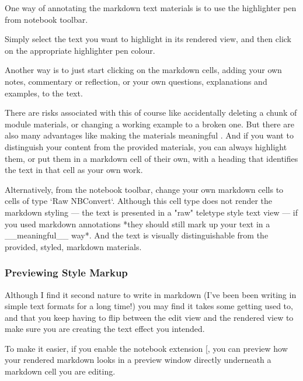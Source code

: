 \documentclass[letterpaper,10pt,english]{sphinxmanual}
\let\sphinxpxdimen\pdfpxdimen\else\newdimen\sphinxpxdimen
\begin{document}
One way of annotating the markdown text materials is to use the highlighter pen from notebook toolbar.

\sphinxincludegraphics[width=1399\sphinxpxdimen,height=251\sphinxpxdimen]{{00_01_highlighter}.png}

Simply select the text you want to highlight in its rendered view, and then click on the appropriate highlighter pen colour.

Another way is to just start clicking on the markdown cells, adding your own notes, commentary or reflection, or your own questions, explanations and examples, to the text.

There are risks associated with this of course \sphinxhyphen{} like accidentally deleting a chunk of module materials, or changing a working example to a broken one. But there are also many advantages \sphinxhyphen{} like making the materials meaningful . And if you want to distinguish your content from the provided materials, you can always highlight them, or put them in a markdown cell of their own, with a heading that identifies the text in that cell as your own work.



Alternatively, from the notebook toolbar, change your own markdown cells to cells of type `Raw NBConvert`. Although this cell type does not render the markdown styling — the text is presented in a "raw" teletype style text view —  if you used markdown annotations *they should still mark up your text in a __meaningful__ way*. And the text is visually distinguishable from the provided, styled, markdown materials.


\subsubsection{Previewing Style Markup}
\label{\detokenize{content/00_READ_ME_FIRST/Section_00_06_RoboLab_Environment:Previewing-Style-Markup}}
Although I find it second nature to write in markdown (I’ve been been writing in simple text formats for a long time!) you may find it takes some getting used to, and that you keep having to flip between the edit view and the rendered view to make sure you are creating the text effect you intended.

To make it easier, if you enable the  notebook extension {[}\sphinxhref{/nbextensions/?nbextension=livemdpreview/livemdpreview}{direct link}{]}, you can preview how your rendered markdown looks in a preview window directly underneath a markdown cell you are editing.
\end{document}
